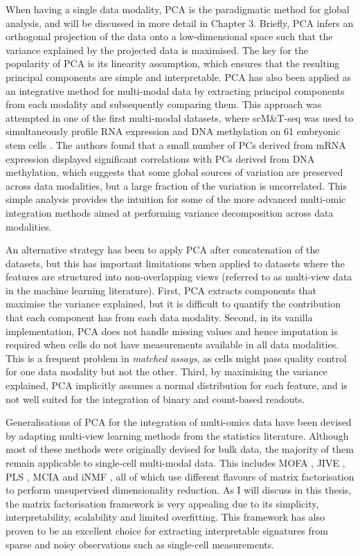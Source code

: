 When having a single data modality, PCA is the paradigmatic method for global analysis, and will be discussed in more detail in Chapter 3. Briefly, PCA infers an orthogonal projection of the data onto a low-dimensional space such that the variance explained by the projected data is maximised. The key for the popularity of PCA is its linearity assumption, which ensures that the resulting principal components are simple and interpretable. PCA has also been applied as an integrative method for multi-modal data by extracting principal components from each modality and subsequently comparing them. This approach was attempted in one of the first multi-modal datasets, where scM\&T-seq was used to simultaneously profile RNA expression and DNA methylation on 61 embryonic stem cells \cite{Angermueller2016}. The authors found that a small number of PCs derived from mRNA expression displayed significant correlations with PCs derived from DNA methylation, which suggests that some global sources of variation are preserved across data modalities, but a large fraction of the variation is uncorrelated. This simple analysis provides the intuition for some of the more advanced multi-omic integration methods aimed at performing variance decomposition across data modalities.

An alternative strategy has been to apply PCA after concatenation of the datasets, but this has important limitations when applied to datasets where the features are structured into non-overlapping views (referred to as multi-view data in the machine learning literature). First, PCA extracts components that maximise the variance explained, but it is difficult to quantify the contribution that each component has from each data modality. Second, in its vanilla implementation, PCA does not handle missing values and hence imputation is required when cells do not have measurements available in all data modalities. This is a frequent problem in \textit{matched assays}, as cells might pass quality control for one data modality but not the other. Third, by maximising the variance explained, PCA implicitly assumes a normal distribution for each feature, and is not well suited for the integration of binary and count-based readouts. 

Generalisations of PCA for the integration of multi-omics data have been devised by adapting multi-view learning methods from the statistics literature. Although most of these methods were originally devised for bulk data, the majority of them remain applicable to single-cell multi-modal data. This includes MOFA \cite{Argelaguet2018}, JIVE \cite{Lock2013}, PLS \cite{Singh2018}, MCIA \cite{Meng2014} and iNMF \cite{Welch2019}, all of which use different flavours of matrix factorisation to perform unsupervised dimensionality reduction. As I will discuss in this thesis, the matrix factorisation framework is very appealing due to its simplicity, interpretability, scalability and limited overfitting. This framework has also proven to be an excellent choice for extracting interpretable signatures from sparse and noisy observations such as single-cell measurements.


